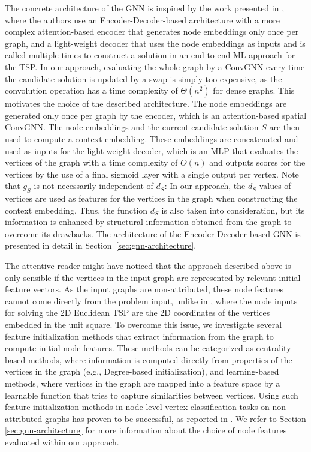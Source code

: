\documentclass[draft,final]{vutinfth} %
\begin{document}
The concrete architecture of the GNN is inspired by the work presented in \cite{Kool2019}, where the authors use an Encoder-Decoder-based architecture with a more complex attention-based encoder that generates node embeddings only once per graph, and a light-weight decoder that uses the node embeddings as inputs and is called multiple times to construct a solution in an end-to-end ML approach for the TSP. 
In our approach, evaluating the whole graph by a ConvGNN every time the candidate solution is updated by a swap is simply too expensive, as the convolution operation has a time complexity of $\Theta(n^2)$ for dense graphs. This motivates the choice of the described architecture. The node embeddings are generated only once per graph by the encoder, which is an attention-based spatial ConvGNN. The node embeddings and the current candidate solution $S$ are then used to compute a context embedding. These embeddings are concatenated and used as inputs for the light-weight decoder, which is an MLP that evaluates the vertices of the graph with a time complexity of $O(n)$ and outputs scores for the vertices by the use of a final sigmoid layer with a single output per vertex. 
Note that $g_S$ is not necessarily independent of $d_S$: In our approach, the $d_S$-values of vertices are used as features for the vertices in the graph when constructing the context embedding. Thus, the function $d_S$ is also taken into consideration, but its information is enhanced by structural information obtained from the graph to overcome its drawbacks. 
The architecture of the Encoder-Decoder-based GNN is presented in detail in Section~\ref{sec:gnn-architecture}. 

The attentive reader might have noticed that the approach described above is only sensible if the vertices in the input graph are represented by relevant initial feature vectors. As the input graphs are non-attributed, these node features cannot come directly from the problem input, unlike in \cite{Kool2019}, where the node inputs for solving the 2D Euclidean TSP are the 2D coordinates of the vertices embedded in the unit square. 
To overcome this issue, we investigate several feature initialization methods that extract information from the graph to compute initial node features. These methods can be categorized as centrality-based methods, where information is computed directly from properties of the vertices in the graph (e.g., Degree-based initialization), and learning-based methods, where vertices in the graph are mapped into a feature space by a learnable function that tries to capture similarities between vertices. Using such feature initialization methods in node-level vertex classification tasks on non-attributed graphs has proven to be successful, as reported in \cite{Duong2019}. We refer to Section \ref{sec:gnn-architecture} for more information about the choice of node features evaluated within our approach. 
\end{document}
